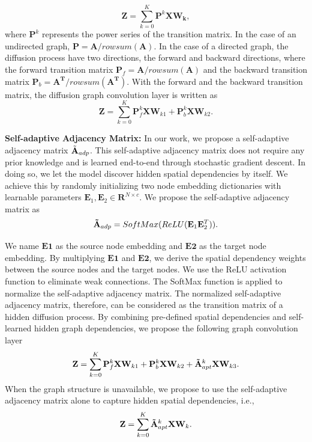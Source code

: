 \begin{equation}
    \label{eq:dcn}
    \mathbf{Z} = \sum_{k=0}^K \mathbf{P}^k\mathbf{X}\mathbf{W_k},
\end{equation}
where $\mathbf{P}^k$ represents the power series of the transition matrix. In the case of an undirected graph, $\mathbf{P} = \mathbf{A}/rowsum(\mathbf{A})$. In the case of a directed graph, the diffusion process have two directions, the forward and backward directions, where the forward transition matrix $\mathbf{P}_f= \mathbf{A}/rowsum(\mathbf{A})$ and the backward transition matrix $\mathbf{P}_b= \mathbf{A^T}/rowsum(\mathbf{A^T})$. With the forward and the backward transition matrix, the diffusion graph convolution layer is written as 
\begin{equation}
    \label{eq:dcn1}
        \mathbf{Z} = \sum_{k=0}^K\mathbf{P}_f^k\mathbf{X}\mathbf{W}_{k1}+\mathbf{P}_b^k\mathbf{X}\mathbf{W}_{k2}.
\end{equation}

\noindent\textbf{Self-adaptive Adjacency Matrix:} 
In our work, we propose a self-adaptive adjacency matrix $\Tilde{\mathbf{A}}_{adp}$. This self-adaptive adjacency matrix does not require any prior knowledge and is learned end-to-end through stochastic gradient descent. In doing so, we let the model discover hidden spatial dependencies by itself. We achieve this by randomly initializing two node embedding dictionaries with learnable parameters $\mathbf{E}_1,\mathbf{E}_2 \in \mathbf{R}^{N\times c}$. We propose the self-adaptive adjacency matrix as 
\begin{equation}
    \mathbf{\Tilde{A}}_{adp}=SoftMax(ReLU(\mathbf{E}_1\mathbf{E}_2^T)).
\end{equation}

We name $\mathbf{E1}$ as the source node embedding and $\mathbf{E2}$ as the target node embedding. By multiplying $\mathbf{E1}$ and $\mathbf{E2}$, we derive the spatial dependency weights between the source nodes and the target nodes.  We use the ReLU activation function to eliminate weak connections. The SoftMax function is applied to normalize the self-adaptive adjacency matrix. The normalized self-adaptive adjacency matrix, therefore, can be considered as the transition matrix of a hidden diffusion process. By combining pre-defined spatial dependencies and self-learned hidden graph dependencies, we propose the following graph convolution layer
\begin{equation}
    \mathbf{Z} = \sum_{k=0}^{K}\mathbf{P}_f^k\mathbf{X}\mathbf{W}_{k1}+\mathbf{P}_b^k\mathbf{X}\mathbf{W}_{k2}+\mathbf{\Tilde{A}}_{apt}^k\mathbf{X}\mathbf{W}_{k3}.
\end{equation}
When the graph structure is unavailable, we propose to use the self-adaptive adjacency matrix alone to capture hidden spatial dependencies, i.e.,
\begin{equation}
        \mathbf{Z} = \sum_{k=0}^{K}\mathbf{\Tilde{A}}_{apt}^k\mathbf{X}\mathbf{W}_k.
\label{eq:adp}
\end{equation}

